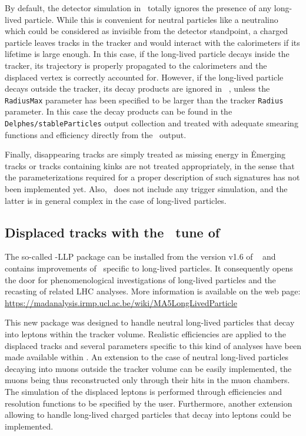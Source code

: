 By default, the detector simulation in \DEL\ totally ignores the presence of any
long-lived particle. While this is convenient for neutral particles like a
neutralino which could be considered as invisible from the detector standpoint,
a charged particle leaves tracks in the tracker and would interact with the
calorimeters if its lifetime is large enough.
In this case, if the long-lived particle decays inside the tracker, its
trajectory is properly propagated to the calorimeters and the displaced vertex
is correctly accounted for. However, if the long-lived particle decays outside
the tracker, its decay products are ignored in \DEL\ , unless the \verb+RadiusMax+
parameter has been specified to be larger than the tracker \verb+Radius+
parameter. In this case the decay products can be found in the
\verb+Delphes/stableParticles+ output collection and
treated with adequate smearing functions and efficiency directly from the \DEL\
output.

Finally, disappearing tracks are simply treated as missing energy in \DEL\. Emerging tracks or tracks containing kinks are not treated appropriately, in the sense that the parameterizations required for a proper description of such signatures has not been implemented yet. Also, \DEL\ does not include any trigger simulation, and the latter is in general complex in the case of long-lived particles.

\subsection{Displaced tracks with the \MA\ tune of \DEL}

The so-called \DEL-LLP package can be installed from the version v1.6 of
\MA~\cite{Conte:2012fm,Conte:2014zja} and contains improvements of \DEL\
specific to long-lived particles. It
consequently opens the door for phenomenological investigations of long-lived
particles and the recasting of related LHC analyses. More information is
available on the web page:\\ \hspace*{0.5cm} \url{
https://madanalysis.irmp.ucl.ac.be/wiki/MA5LongLivedParticle}

This new package was designed to handle neutral long-lived particles that decay
into leptons within the tracker volume. Realistic efficiencies are applied to
the displaced tracks and several parameters specific to this kind of analyses
have been made available within \MA. An extension to the case of neutral
long-lived particles decaying into muons outside the tracker volume can be easily
implemented, the muons being thus reconstructed only through their hits in the
muon chambers. The simulation of the displaced leptons is performed through efficiencies and resolution functions to be specified by the user. Furthermore, another
extension allowing to handle long-lived charged particles that decay into
leptons could be implemented.

